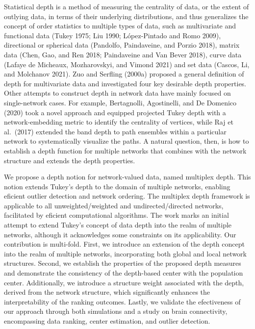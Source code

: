 \documentclass[
  10
]{article}
\begin{document}
Statistical depth is a method of measuring the centrality of data, or
the extent of outlying data, in terms of their underlying distributions,
and thus generalizes the concept of order statistics to multiple types
of data, such as multivariate and functional data (Tukey 1975; Liu 1990;
López-Pintado and Romo 2009), directional or spherical data (Pandolfo,
Paindaveine, and Porzio 2018), matrix data (Chen, Gao, and Ren 2018;
Paindaveine and Van Bever 2018), curve data (Lafaye de Micheaux,
Mozharovskyi, and Vimond 2021) and set data (Cascos, Li, and Molchanov
2021). Zuo and Serfling (2000a) proposed a general definition of depth
for multivariate data and investigated four key desirable depth
properties. Other attempts to construct depth in network data have
mainly focused on single-network cases. For example, Bertagnolli,
Agostinelli, and De Domenico (2020) took a novel approach and equipped
projected Tukey depth with a network-embedding metric to identify the
centrality of vertices, while Raj et al.~(2017) extended the band depth
to path ensembles within a particular network to systematically
visualize the paths. A natural question, then, is how to establish a
depth function for multiple networks that combines with the network
structure and extends the depth properties.

We propose a depth notion for network-valued data, named multiplex
depth. This notion extends Tukey's depth to the domain of multiple
networks, enabling eficient outlier detection and network ordering. The
multiplex depth framework is applicable to all unweighted/weighted and
undirected/directed networks, facilitated by eficient computational
algorithms. The work marks an initial attempt to extend Tukey's concept
of data depth into the realm of multiple networks, although it
acknowledges some constraints on its applicability. Our contribution is
multi-fold. First, we introduce an extension of the depth concept into
the realm of multiple networks, incorporating both global and local
network structures. Second, we establish the properties of the proposed
depth measures and demonstrate the consistency of the depth-based center
with the population center. Additionally, we introduce a structure
weight associated with the depth, derived from the network structure,
which significantly enhances the interpretability of the ranking
outcomes. Lastly, we validate the efectiveness of our approach through
both simulations and a study on brain connectivity, encompassing data
ranking, center estimation, and outlier detection.
\end{document}
